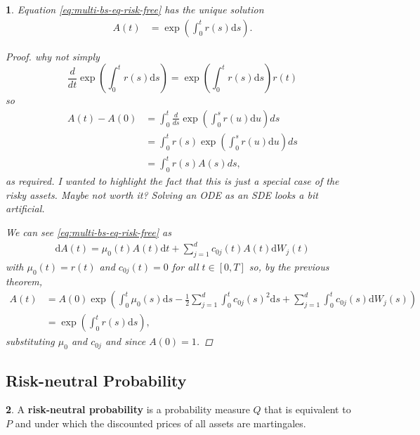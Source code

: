 \documentclass[english]{article}
\newcommand{\comment}[1]{\color{blue}#1\color{black}}
\newcommand{\tomcomment}[1]{\color{orange}#1\color{black}}
\numberwithin{equation}{section}
\numberwithin{figure}{section}
\theoremstyle{bolddescit}
\newtheorem{theorem}{\protect\theoremname}[section]
\theoremstyle{definition}
\newtheorem{definition}[theorem]{\protect\definitionname}
\theoremstyle{definition}
\theoremstyle{plain}
\theoremstyle{plain}
\theoremstyle{bolddesc}
\theoremstyle{plain}
\theoremstyle{remark}
\providecommand{\definitionname}{Definition}
\providecommand{\theoremname}{Theorem}
\begin{document}
\begin{theorem}\label{thm:bs-solution-risk-free}
  Equation \eqref{eq:multi-bs-eq-risk-free} has the unique solution
  \begin{align*}
    A(t) &= \exp \left( \int_0^t r(s) \mathrm{d}s \right).
  \end{align*}

  \begin{proof}
\comment{why not simply
\[\frac{d}{dt} \exp \left( \int_0^t r(s) \mathrm{d}s \right) = \exp \left( \int_0^t r(s) \mathrm{d}s \right) r(t)  \]
so
\begin{align*}
A(t)-A(0) & =  \int_0^t \frac{d}{ds} \exp \left( \int_0^s r(u) \mathrm{d}u \right) ds \\
& =  \int_0^t r(s)\exp \left( \int_0^s r(u) \mathrm{d}u \right) ds \\
& = \int_0^t r(s)A(s) ds,
\end{align*}
as required.
}
\tomcomment{I wanted to highlight the fact that this is just a special case of the risky assets. Maybe not worth it?}
\comment{Solving an ODE as an SDE looks a bit artificial.}

    We can see \eqref{eq:multi-bs-eq-risk-free} as
    \begin{align*}
      \mathrm{d}A(t) = \mu_0(t) A(t) \mathrm{d}t + \sum_{j=1}^{d} c_{0j}(t) A(t) \mathrm{d}W_j(t)
    \end{align*}
    with $\mu_0(t) = r(t)$ and $c_{0j}(t) = 0$ for all $t \in [0,T]$ so, by the previous theorem,
    \begin{align*}
      A(t) &= A(0) \exp \left( \int_0^t \mu_0(s) \mathrm{d}s - \frac{1}{2} \sum_{j=1}^{d} \int_0^t c_{0j}(s)^2 \mathrm{d}s + \sum_{j=1}^d \int_0^t c_{0j}(s) \mathrm{d}W_j(s) \right)\\
      &= \exp \left( \int_0^t r(s) \mathrm{d}s\right),
    \end{align*}
    substituting $\mu_0$ and $c_{0j}$ and since $A(0) = 1$.
  \end{proof}
\end{theorem}

\subsection{Risk-neutral Probability}

\begin{definition}
  A \textbf{risk-neutral probability} is a probability measure $Q$ that is equivalent to $P$ and under which the discounted prices of all assets are martingales.
\end{definition}
\end{document}
